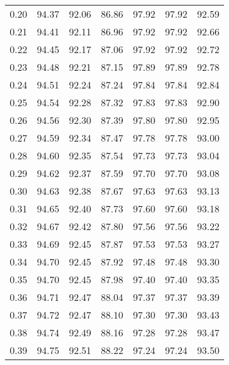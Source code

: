 \begin{tabular}{|c|c|c|c|c|c|c|}
      0.20 &     94.37 &     92.06 &      86.86 &   97.92 &      97.92 &         92.59 \\
      0.21 &     94.41 &     92.11 &      86.96 &   97.92 &      97.92 &         92.66 \\
      0.22 &     94.45 &     92.17 &      87.06 &   97.92 &      97.92 &         92.72 \\
      0.23 &     94.48 &     92.21 &      87.15 &   97.89 &      97.89 &         92.78 \\
      0.24 &     94.51 &     92.24 &      87.24 &   97.84 &      97.84 &         92.84 \\
      0.25 &     94.54 &     92.28 &      87.32 &   97.83 &      97.83 &         92.90 \\
      0.26 &     94.56 &     92.30 &      87.39 &   97.80 &      97.80 &         92.95 \\
      0.27 &     94.59 &     92.34 &      87.47 &   97.78 &      97.78 &         93.00 \\
      0.28 &     94.60 &     92.35 &      87.54 &   97.73 &      97.73 &         93.04 \\
      0.29 &     94.62 &     92.37 &      87.59 &   97.70 &      97.70 &         93.08 \\
      0.30 &     94.63 &     92.38 &      87.67 &   97.63 &      97.63 &         93.13 \\
      0.31 &     94.65 &     92.40 &      87.73 &   97.60 &      97.60 &         93.18 \\
      0.32 &     94.67 &     92.42 &      87.80 &   97.56 &      97.56 &         93.22 \\
      0.33 &     94.69 &     92.45 &      87.87 &   97.53 &      97.53 &         93.27 \\
      0.34 &     94.70 &     92.45 &      87.92 &   97.48 &      97.48 &         93.30 \\
      0.35 &     94.70 &     92.45 &      87.98 &   97.40 &      97.40 &         93.35 \\
      0.36 &     94.71 &     92.47 &      88.04 &   97.37 &      97.37 &         93.39 \\
      0.37 &     94.72 &     92.47 &      88.10 &   97.30 &      97.30 &         93.43 \\
      0.38 &     94.74 &     92.49 &      88.16 &   97.28 &      97.28 &         93.47 \\
      0.39 &     94.75 &     92.51 &      88.22 &   97.24 &      97.24 &         93.50 \\

\end{tabular}
